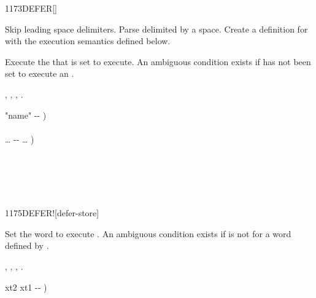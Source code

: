 \begin{worddef}{1173}{DEFER}[]%
\item {}

	Skip leading space delimiters.  Parse  delimited by a
	space.  Create a definition for  with the execution
	semantics defined below.

\execute[name]

	Execute the  that  is set to execute.
	An ambiguous condition exists if  has not been
	set to execute an .

\see {},
	,
	,
	.

	\begin{implement} %
		\word{:}   "name" -{}- ) \\
		\tab {} \word{[']}  \word{,} \\
		  {\ldots} -{}- {\ldots} ) \\
		\tab {}  \word{;}
	\end{implement}

	\begin{testing} %
		 \\
		 \\

		 \\
	\end{testing}
\end{worddef}


\begin{worddef}{1175}{DEFER!}[defer-store]%
\item {}

	Set the word  to execute .  An ambiguous
	condition exists if  is not for a word defined by
	.

\see {},
	,
	,
	.

	\begin{implement} %
		\word{:}   xt2 xt1 -{}- ) \\
		\tab {} \word{!} \word{;}
	\end{implement}

	\begin{testing} %

		 \\

		 \\
	\end{testing}
\end{worddef}


